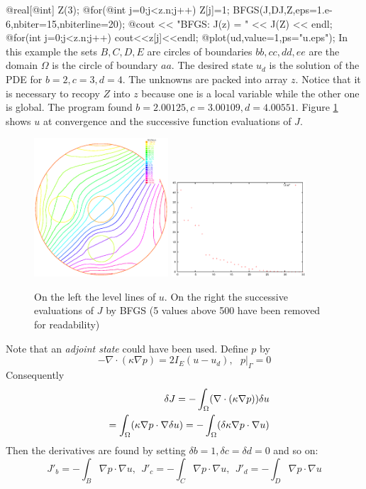\documentclass[a4paper,twoside,12pt]{book}
\begin{document}
 @real[@int] Z(3);
 @for(@int j=0;j<z.n;j++) Z[j]=1;
 BFGS(J,DJ,Z,eps=1.e-6,nbiter=15,nbiterline=20);
 @cout << "BFGS: J(z) = " << J(Z) <<  endl;
 @for(int j=0;j<z.n;j++) cout<<z[j]<<endl;
 @plot(ud,value=1,ps="u.eps");
\eFF
In this example the sets $B,C,D,E$ are circles of boundaries $bb,cc,dd,ee$ are the domain
$\Omega$ is the circle of boundary $aa$.  The desired state $u_d$ is the solution
of the PDE for $b=2,c=3,d=4$.  The unknowns are packed into array $z$.  Notice that it is
necessary to recopy $Z$ into $z$ because one is a local variable while the other one is global.
The program found $b=2.00125,c=3.00109,d=4.00551$.
Figure \ref{figcontrol} shows $u$ at convergence
and the successive function evaluations of $J$.
\begin{figure}[htbp]
\begin{center}
\includegraphics[width=5cm]{u-bfgs}
\includegraphics[width=5cm]{J-bfgs}
\caption{\label{figcontrol}On the left the level lines of $u$. On the right the successive evaluations of
$J$ by BFGS (5 values above 500 have been removed for readability)}
\end{center}
\end{figure}
Note that an \emph{adjoint state} could have been used. Define $p$ by
\[
-\nabla\cdot(\kappa\nabla p)=2I_E(u-u_d),~~~p|_\Gamma=0
\]
Consequently
\begin{eqnarray}&&
\delta J = -\int_{\Omega} (\nabla\cdot(\kappa\nabla p))\delta u
\cr&&
= \int_\Omega(\kappa\nabla p\cdot\nabla\delta u)
=-\int_\Omega(\delta\kappa\nabla p\cdot\nabla u)
\end{eqnarray}
Then the derivatives are found by setting $\delta b=1, \delta c=\delta d=0$ and so on:
\[
    J'_b=-\int_B \nabla p\cdot\nabla u,~~J'_c=-\int_C \nabla p\cdot\nabla u,~~
    J'_d=-\int_D \nabla p\cdot\nabla u
\]
\end{document}

